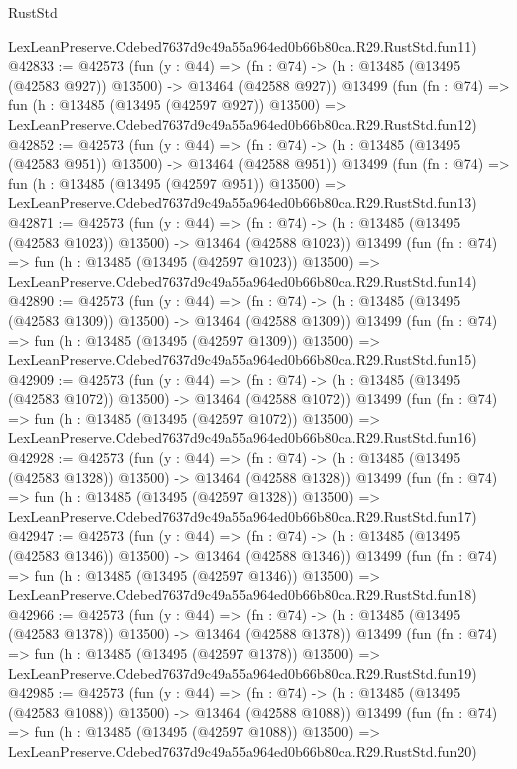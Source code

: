 \begin{lexlean}{RustStd}
\begin{coremodule}
    LexLeanPreserve.Cdebed7637d9c49a55a964ed0b66b80ca.R29.RustStd.fun11)
@42833 := @42573
    (fun (y : @44) =>
    (fn : @74) -> (h : @13485 (@13495 (@42583 @927)) @13500) -> @13464 (@42588 @927))
    @13499
    (fun (fn : @74) =>
    fun (h : @13485 (@13495 (@42597 @927)) @13500) =>
    LexLeanPreserve.Cdebed7637d9c49a55a964ed0b66b80ca.R29.RustStd.fun12)
@42852 := @42573
    (fun (y : @44) =>
    (fn : @74) -> (h : @13485 (@13495 (@42583 @951)) @13500) -> @13464 (@42588 @951))
    @13499
    (fun (fn : @74) =>
    fun (h : @13485 (@13495 (@42597 @951)) @13500) =>
    LexLeanPreserve.Cdebed7637d9c49a55a964ed0b66b80ca.R29.RustStd.fun13)
@42871 := @42573
    (fun (y : @44) =>
    (fn : @74) -> (h : @13485 (@13495 (@42583 @1023)) @13500) -> @13464 (@42588 @1023))
    @13499
    (fun (fn : @74) =>
    fun (h : @13485 (@13495 (@42597 @1023)) @13500) =>
    LexLeanPreserve.Cdebed7637d9c49a55a964ed0b66b80ca.R29.RustStd.fun14)
@42890 := @42573
    (fun (y : @44) =>
    (fn : @74) -> (h : @13485 (@13495 (@42583 @1309)) @13500) -> @13464 (@42588 @1309))
    @13499
    (fun (fn : @74) =>
    fun (h : @13485 (@13495 (@42597 @1309)) @13500) =>
    LexLeanPreserve.Cdebed7637d9c49a55a964ed0b66b80ca.R29.RustStd.fun15)
@42909 := @42573
    (fun (y : @44) =>
    (fn : @74) -> (h : @13485 (@13495 (@42583 @1072)) @13500) -> @13464 (@42588 @1072))
    @13499
    (fun (fn : @74) =>
    fun (h : @13485 (@13495 (@42597 @1072)) @13500) =>
    LexLeanPreserve.Cdebed7637d9c49a55a964ed0b66b80ca.R29.RustStd.fun16)
@42928 := @42573
    (fun (y : @44) =>
    (fn : @74) -> (h : @13485 (@13495 (@42583 @1328)) @13500) -> @13464 (@42588 @1328))
    @13499
    (fun (fn : @74) =>
    fun (h : @13485 (@13495 (@42597 @1328)) @13500) =>
    LexLeanPreserve.Cdebed7637d9c49a55a964ed0b66b80ca.R29.RustStd.fun17)
@42947 := @42573
    (fun (y : @44) =>
    (fn : @74) -> (h : @13485 (@13495 (@42583 @1346)) @13500) -> @13464 (@42588 @1346))
    @13499
    (fun (fn : @74) =>
    fun (h : @13485 (@13495 (@42597 @1346)) @13500) =>
    LexLeanPreserve.Cdebed7637d9c49a55a964ed0b66b80ca.R29.RustStd.fun18)
@42966 := @42573
    (fun (y : @44) =>
    (fn : @74) -> (h : @13485 (@13495 (@42583 @1378)) @13500) -> @13464 (@42588 @1378))
    @13499
    (fun (fn : @74) =>
    fun (h : @13485 (@13495 (@42597 @1378)) @13500) =>
    LexLeanPreserve.Cdebed7637d9c49a55a964ed0b66b80ca.R29.RustStd.fun19)
@42985 := @42573
    (fun (y : @44) =>
    (fn : @74) -> (h : @13485 (@13495 (@42583 @1088)) @13500) -> @13464 (@42588 @1088))
    @13499
    (fun (fn : @74) =>
    fun (h : @13485 (@13495 (@42597 @1088)) @13500) =>
    LexLeanPreserve.Cdebed7637d9c49a55a964ed0b66b80ca.R29.RustStd.fun20)

\end{coremodule}
\end{lexlean}
